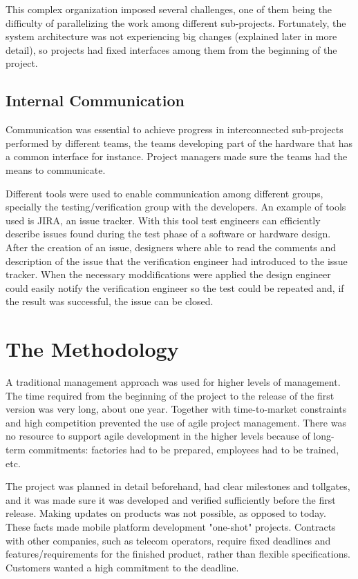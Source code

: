 \documentclass[conference]{IEEEtran}
\begin{document}
This complex organization imposed several challenges, one of them being the difficulty of parallelizing the work among different sub-projects. Fortunately, the system architecture was not experiencing big changes (explained later in more detail), so projects had fixed interfaces among them from the beginning of the project.

\subsection{Internal Communication}
Communication was essential to achieve progress in interconnected sub-projects performed by different teams, the teams developing part of the hardware that has a common interface for instance. Project managers made sure the teams had the means to communicate. 

Different tools were used to enable communication among different groups, specially the testing/verification group with the developers. An example of tools used is JIRA, an issue tracker. With this tool test engineers can efficiently describe issues found during the test phase of a software or hardware design. After the creation of an issue, designers where able to read the comments and description of the issue that the verification engineer had introduced to the issue tracker. When the necessary moddifications were applied the design engineer could easily notify the verification engineer so the test could be repeated and, if the result was successful, the issue can be closed.

\section{The Methodology}
A traditional management approach was used for higher levels of management. The time required from the beginning of the project to the release of the first version was very long, about one year. Together with time-to-market constraints and high competition prevented the use of agile project management. There was no resource to support agile development in the higher levels because of long-term commitments: factories had to be prepared, employees had to be trained, etc. 

The project was planned in detail beforehand, had clear milestones and tollgates, and it was made sure it was developed and verified sufficiently before the first release. Making updates on products was not possible, as opposed to today. These facts made mobile platform development "one-shot" projects. Contracts with other companies, such as telecom operators, require fixed deadlines and features/requirements for the finished product, rather than flexible specifications. Customers wanted a high commitment to the deadline.
\end{document}
